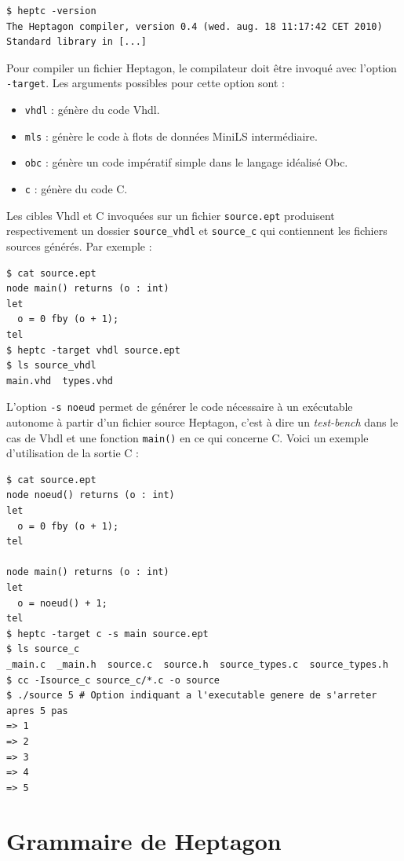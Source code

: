 \documentclass[a4paper]{article}
\newcommand{\LANG}{{\sc Heptagon}}
\newcommand{\minils}{{\sc MiniLS}}
\newcommand{\vhdl}{{\sc Vhdl}}
\begin{document}
\begin{verbatim}
$ heptc -version
The Heptagon compiler, version 0.4 (wed. aug. 18 11:17:42 CET 2010)
Standard library in [...]
\end{verbatim}

Pour compiler un fichier \LANG, le compilateur doit \^etre invoqu\'e avec l'option
\verb/-target/. Les arguments possibles pour cette option sont :

\begin{itemize}
\item \verb/vhdl/ : g\'en\`ere du code \vhdl{}.
\item \verb/mls/ : g\'en\`ere le code \`a flots de donn\'ees \minils{} interm\'ediaire.
\item \verb/obc/ : g\'en\`ere un code imp\'eratif simple dans le langage id\'ealis\'e Obc.
\item \verb/c/ : g\'en\`ere du code C.
\end{itemize}

Les cibles \vhdl{} et C invoqu\'ees sur un fichier \verb/source.ept/ produisent
respectivement un dossier \verb/source_vhdl/ et \verb/source_c/ qui contiennent
les fichiers sources g\'en\'er\'es. Par exemple :

\begin{verbatim}
$ cat source.ept
node main() returns (o : int)
let
  o = 0 fby (o + 1);
tel
$ heptc -target vhdl source.ept
$ ls source_vhdl
main.vhd  types.vhd
\end{verbatim}

L'option \verb/-s noeud/ permet de g\'en\'erer le code n\'ecessaire \`a un
ex\'ecutable autonome \`a partir d'un fichier source \LANG, c'est \`a dire un
\textit{test-bench} dans le cas de \vhdl{} et une fonction \verb/main()/ en ce
qui concerne C. Voici un exemple d'utilisation de la sortie C :

\begin{verbatim}
$ cat source.ept
node noeud() returns (o : int)
let
  o = 0 fby (o + 1);
tel

node main() returns (o : int)
let
  o = noeud() + 1;
tel
$ heptc -target c -s main source.ept
$ ls source_c
_main.c  _main.h  source.c  source.h  source_types.c  source_types.h
$ cc -Isource_c source_c/*.c -o source
$ ./source 5 # Option indiquant a l'executable genere de s'arreter apres 5 pas
=> 1
=> 2
=> 3
=> 4
=> 5
\end{verbatim}

\section{Grammaire de Heptagon}
\end{document}

